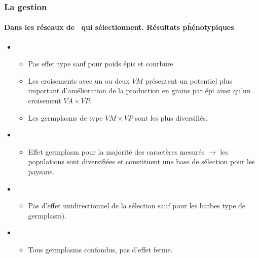 \begin{frame}
\frametitle{La gestion \insitu}
\framesubtitle{Dans les réseaux de \MSPs~qui sélectionnent. Résultats pĥénotypiques}

\begin{itemize}[<+->]

\item {}

\begin{itemize}
\item Pas effet type sauf pour poids épis et courbure
\item Les croisements avec un ou deux $VM$ présentent un potentiel plus important d'amélioration de la production en grains par épi ainsi qu'un croisement $VA \times VP$.
\item Les germplasms de type $VM \times VP$ sont les plus diversifiés.
\end{itemize}


\item {}
\begin{itemize}
\item Effet germplasm pour la majorité des caractères mesurés $\rightarrow$ les populations sont diversifiées et constituent une base de sélection pour les paysans.
\end{itemize}

\item {}

\begin{itemize}
\item Pas d'effet unidirectionnel de la sélection sauf pour les barbes %
type de germplasm).
\end{itemize}

\item {}
\begin{itemize}
\item Tous germplasms confondus, pas d'effet ferme.
\end{itemize}


\end{itemize}


\end{frame}




